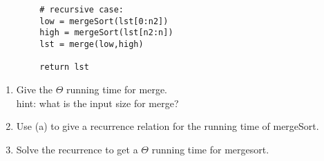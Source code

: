 \documentclass[basic, header]{nosvagor-notes}
\begin{document}
\begin{enumerate}[itemsep=4em]
\begin{multicols}{2}
\begin{verbatim}
        # recursive case:
        low = mergeSort(lst[0:n2])
        high = mergeSort(lst[n2:n])
        lst = merge(low,high)

        return lst
      \end{verbatim}
    \end{multicols}

  \begin{enumerate}[itemsep=4em]
    \item Give the $\Theta$ running time for merge.\\
      hint: what is the input size for merge?
    \item Use (a) to give a recurrence relation for the running time of mergeSort.
    \item Solve the recurrence to get a $\Theta$ running time for mergesort.
  \end{enumerate}

\end{enumerate}
\end{document}
